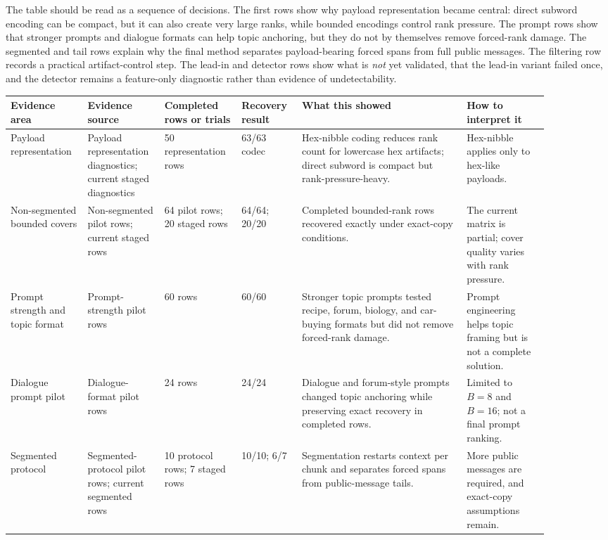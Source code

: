 \documentclass[fleqn,10pt]{wlscirep}
\begin{document}
The table should be read as a sequence of decisions. The first rows show why payload representation became central: direct subword encoding can be compact, but it can also create very large ranks, while bounded encodings control rank pressure. The prompt rows show that stronger prompts and dialogue formats can help topic anchoring, but they do not by themselves remove forced-rank damage. The segmented and tail rows explain why the final method separates payload-bearing forced spans from full public messages. The filtering row records a practical artifact-control step. The lead-in and detector rows show what is \emph{not} yet validated, that the lead-in variant failed once, and the detector remains a feature-only diagnostic rather than evidence of undetectability.

\begin{table}[H]
\centering
\scriptsize
\setlength{\tabcolsep}{2pt}
\begin{tabular}{L{0.12\linewidth} L{0.12\linewidth} L{0.12\linewidth} L{0.10\linewidth} L{0.29\linewidth} L{0.14\linewidth}}
\toprule
Evidence area & Evidence source & Completed rows or trials & Recovery result & What this showed & How to interpret it \\
\midrule
Payload representation & Payload representation diagnostics; current staged diagnostics & 50 representation rows & 63/63 codec & Hex-nibble coding reduces rank count for lowercase hex artifacts; direct subword is compact but rank-pressure-heavy. & Hex-nibble applies only to hex-like payloads. \\
Non-segmented bounded covers & Non-segmented pilot rows; current staged rows & 64 pilot rows; 20 staged rows & 64/64; 20/20 & Completed bounded-rank rows recovered exactly under exact-copy conditions. & The current matrix is partial; cover quality varies with rank pressure. \\
Prompt strength and topic format & Prompt-strength pilot rows & 60 rows & 60/60 & Stronger topic prompts tested recipe, forum, biology, and car-buying formats but did not remove forced-rank damage. & Prompt engineering helps topic framing but is not a complete solution. \\
Dialogue prompt pilot & Dialogue-format pilot rows & 24 rows & 24/24 & Dialogue and forum-style prompts changed topic anchoring while preserving exact recovery in completed rows. & Limited to \(B=8\) and \(B=16\); not a final prompt ranking. \\
Segmented protocol & Segmented-protocol pilot rows; current segmented rows & 10 protocol rows; 7 staged rows & 10/10; 6/7 & Segmentation restarts context per chunk and separates forced spans from public-message tails. & More public messages are required, and exact-copy assumptions remain. \\

\end{tabular}
\end{table}
\end{document}
